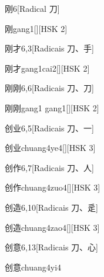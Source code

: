 \begin{entry}{刚}{6}[Radical ⼑]
  \begin{phonetics}{刚}{gang1}[][HSK 2]
  \end{phonetics}
\end{entry}

\begin{entry}{刚才}{6,3}[Radicais ⼑、⼿]
  \begin{phonetics}{刚才}{gang1cai2}[][HSK 2]
  \end{phonetics}
\end{entry}

\begin{entry}{刚刚}{6,6}[Radicais ⼑、⼑]
  \begin{phonetics}{刚刚}{gang1 gang1}[][HSK 2]
  \end{phonetics}
\end{entry}

\begin{entry}{创业}{6,5}[Radicais ⼑、⼀]
  \begin{phonetics}{创业}{chuang4ye4}[][HSK 3]
  \end{phonetics}
\end{entry}

\begin{entry}{创作}{6,7}[Radicais ⼑、⼈]
  \begin{phonetics}{创作}{chuang4zuo4}[][HSK 3]
  \end{phonetics}
\end{entry}

\begin{entry}{创造}{6,10}[Radicais ⼑、⾡]
  \begin{phonetics}{创造}{chuang4zao4}[][HSK 3]
  \end{phonetics}
\end{entry}

\begin{entry}{创意}{6,13}[Radicais ⼑、⼼]
  \begin{phonetics}{创意}{chuang4yi4}
  \end{phonetics}
\end{entry}

